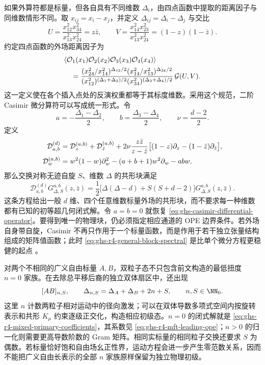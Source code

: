 如果外算符都是标量，但各自具有不同维数 $\Delta_i$，由四点函数中提取的距离因子与同维数情形不同。取 $x_{ij}=x_i-x_j$，并定义 $\Delta_{ij}=\Delta_i-\Delta_j$ 与交比
\begin{equation*}
 U=\frac{x_{12}^2x_{34}^2}{x_{13}^2x_{24}^2}=z\bar z,
 \qquad
 V=\frac{x_{14}^2x_{23}^2}{x_{13}^2x_{24}^2}=(1-z)(1-\bar z).
\end{equation*}
约定四点函数的外场距离因子为
\begin{align}\label{eq:ghs-r4-general-fourpoint-prefactor}
 &\langle\mathcal O_1(x_1)\mathcal O_2(x_2)
 \mathcal O_3(x_3)\mathcal O_4(x_4)\rangle\\
 &\quad=\frac{(x_{24}^2/x_{14}^2)^{\Delta_{12}/2}
 (x_{14}^2/x_{13}^2)^{\Delta_{34}/2}}
 {(x_{12}^2)^{(\Delta_1+\Delta_2)/2}
 (x_{34}^2)^{(\Delta_3+\Delta_4)/2}}\,\mathcal G(U,V).
 \notag
\end{align}
这一定义使在各个插入点处的反演权重都等于其标度维数。采用这个规范，二阶 Casimir 微分算符可以写成统一形式。令
\begin{equation}\label{eq:ghs-r4-casimir-external-weights}
 a=-\frac{\Delta_1-\Delta_2}{2},\qquad
 b=\frac{\Delta_3-\Delta_4}{2},\qquad
 \nu=\frac{d-2}{2}.
\end{equation}
定义
\begin{align}\label{eq:ghs-r4-casimir-general-d}
 \mathcal D_{a,b}^{(d)}
 &=\mathcal D_z^{(a,b)}+\mathcal D_{\bar z}^{(a,b)}
 +2\nu\frac{z\bar z}{z-\bar z}
 \bigl[(1-z)\partial_z-(1-\bar z)\partial_{\bar z}\bigr],\\
 \mathcal D_w^{(a,b)}
 &=w^2(1-w)\partial_w^2-(a+b+1)w^2\partial_w-abw.
 \notag
\end{align}
那么交换对称无迹自旋 $S$、维数 $\Delta$ 的共形块满足
\begin{equation}\label{eq:ghs-r4-casimir-general-eq}
 \mathcal D_{a,b}^{(d)}G_{\Delta,S}^{a,b}(z,\bar z)
 =\frac12\bigl[\Delta(\Delta-d)+S(S+d-2)\bigr]
 G_{\Delta,S}^{a,b}(z,\bar z).
\end{equation}
这条方程给出一般 $d$ 维、四个任意维数标量外场的共形块，而不要求每一种维数都有已知的初等超几何闭式解。令 $a=b=0$ 就恢复 \cref{eq:ghs-casimir-differential-operator}。要得到唯一的物理块，仍必须指定相应通道的 OPE 边界条件。若外场自身带自旋，Casimir 不再只作用于一个标量函数，而是作用于若干独立张量结构组成的矩阵值函数；此时 \cref{eq:ghs-r4-general-block-spectral} 是比单个微分方程更稳健的起点 \cite{ghs-dolan-osborn,ghs-costa-radial-spin,ghs-hogervorst}。


对两个不相同的广义自由标量 $A,B$，双粒子态不只包含前文构造的最低扭度 $n=0$ 家族。在去除总平移后裔的独立双体扇区中，还出现
\begin{equation}\label{eq:ghs-r4-generalized-free-doubletrace}
 [AB]_{n,S},\qquad
 \Delta_{n,S}=\Delta_A+\Delta_B+2n+S,
 \qquad n,S\in\NN_0.
\end{equation}
这里 $n$ 计数两粒子相对运动中的径向激发；可以在双体导数多项式空间内按旋转表示和共形 $K_\mu$ 约束逐级正交化，构造相应初级态。$n=0$ 的闭式解就是 \cref{eq:ghs-r4-mixed-primary-coefficients}，其系数见 \cref{eq:ghs-r4-mft-leading-ope}；$n>0$ 的归一化则需要更高导数阶数的 Gram 矩阵。相同实标量的相同粒子交换还要求 $S$ 为偶数。若标量恰好饱和自由场幺正性界，运动方程会进一步产生零范数关系，因而不能把广义自由长表示的全部 $n$ 家族原样保留为独立物理初级。

